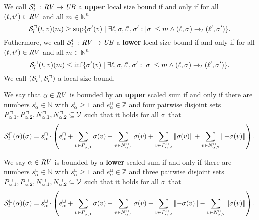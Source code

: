 \begin{definition}
  We call ${\mathcal{S}^\sqcap_l}: \mathit{RV} \rightarrow \mathit{UB}$ a \textbf{upper} local size bound if and only if for all $(t, v') \in \mathit{RV}$ and all $m \in \mathbb{N}^n$
  \[ {\mathcal{S}^\sqcap_l}(t, v)(m) \geq \sup \lbrace \sigma'(v) \mid \exists \ell, \sigma, \ell', \sigma': \left|\sigma\right| \leq m \wedge (\ell_{}, \sigma_{}) \rightarrow_t (\ell', \sigma') \rbrace. \]
  Futhermore, we call ${\mathcal{S}^\sqcup_l}: \mathit{RV} \rightarrow \mathit{UB}$ a \textbf{lower} local size bound if and only if for all $(t, v') \in \mathit{RV}$ and all $m \in \mathbb{N}^n$
  \[ {\mathcal{S}^\sqcup_l}(t, v)(m) \leq \inf \lbrace \sigma'(v) \mid \exists \ell, \sigma, \ell', \sigma': \left|\sigma\right| \leq m \wedge (\ell_{}, \sigma_{}) \rightarrow_t (\ell', \sigma') \rbrace. \]
  We call ${({\mathcal{S}^\sqcup_l}, {\mathcal{S}^\sqcap_l})}$ a local size bound.
\end{definition}

\begin{definition}
  We say that $\alpha \in \mathit{RV}$ is bounded by an \textbf{upper} scaled sum if and only if there are numbers $s^\sqcap_\alpha \in \mathbb{N}$ with $s^\sqcap_\alpha \geq 1$ and $e^\sqcap_\alpha \in \mathbb{Z}$ and four pairwise disjoint sets $P_{\alpha,1}^\sqcap, P_{\alpha,2}^\sqcap, N_{\alpha,1}^\sqcap, N_{\alpha,2}^\sqcap \subseteq \mathcal{V}$ such that it holds for all $\sigma$ that
  \[ {\mathcal{S}^\sqcap_l}(\alpha)(\sigma) =
    s^\sqcap_\alpha \cdot \left(
        e^\sqcap_\alpha
      + \sum_{v \in P_{\alpha,1}^\sqcap} \sigma(v)
      - \sum_{v \in N_{\alpha,1}^\sqcap} \sigma(v)
      + \sum_{v \in P_{\alpha,2}^\sqcap} \left\Vert\sigma(v)\right\Vert
      + \sum_{v \in N_{\alpha,2}^\sqcap} \left\Vert-\sigma(v)\right\Vert
    \right). \]

  We say $\alpha \in \mathit{RV}$ is bounded by a \textbf{lower} scaled sum if and only if there are numbers $s^\sqcup_\alpha \in \mathbb{N}$ with $s^\sqcup_\alpha \geq 1$ and $e^\sqcup_\alpha \in \mathbb{Z}$ and three pairwise disjoint sets $P_{\alpha,1}^\sqcap, P_{\alpha,2}^\sqcap, N_{\alpha,1}^\sqcap, N_{\alpha,2}^\sqcap \subseteq \mathcal{V}$ such that it holds for all $\sigma$ that
  \[ {\mathcal{S}^\sqcup_l}(\alpha)(\sigma) =
    s^\sqcup_\alpha \cdot \left(
      e^\sqcup_\alpha
    + \sum_{v \in P_{\alpha,1}^\sqcup} \sigma(v)
    - \sum_{v \in N_{\alpha,1}^\sqcup} \sigma(v)
    - \sum_{v \in P_{\alpha,2}^\sqcup} \left\Vert-\sigma(v)\right\Vert
    - \sum_{v \in N_{\alpha,2}^\sqcup} \left\Vert\sigma(v)\right\Vert
  \right). \]
\end{definition}

